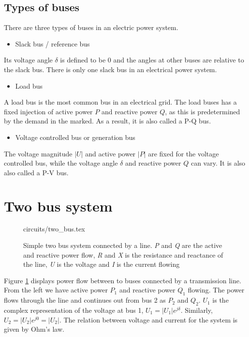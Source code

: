 \documentclass[class=book, crop=false]{standalone}
\begin{document}
\subsection{Types of buses}\label{theory:subsection:bus_types}

There are three types of buses in an electric power system\cite{opf_intro}.

\begin{itemize}
  \item Slack bus / reference bus
\end{itemize}
Its voltage angle $\delta$ is defined to be 0 and the angles at other buses are relative to the slack bus. There is only one slack bus in an electrical power system.

\begin{itemize}
  \item Load bus
\end{itemize}
A load bus is the most common bus in an electrical grid. The load buses has a fixed injection of active power $P$ and reactive power $Q$, as this is predetermined by the demand in the marked. As a result, it is also called a P-Q bus.

\begin{itemize}
  \item Voltage controlled bus or generation bus
\end{itemize}
The voltage magnitude $|U|$ and active power $|P|$ are fixed for the voltage controlled bus, while the voltage angle $\delta$ and reactive power $Q$ can vary. It is also also called a P-V bus. 


\section{Two bus system} 


\begin{figure}[ht!]
    \center
    {circuits/two_bus.tex}
    \caption[size = 9]
    {Simple two bus system connected by a line. \textit{P} and \textit{Q} are the active and reactive power flow, \textit{R} and \textit{X} is the resistance and reactance of the line, \textit{U} is the voltage and \textit{I} is the current flowing}    \label{fig:theory:two_bus}
\end{figure}

Figure \ref{fig:theory:two_bus} displays power flow between to buses connected by a transmission line. From the left we have active power $P_{1}$ and reactive power $Q_{1}$ flowing. The power flows through the line and continues out from bus 2 as $P_{2}$ and $Q_{2}$. $U_{1}$ is the complex representation of the voltage at bus 1, $U_{1} = |U_{1}|e^{j\delta}$. Similarly, $U_{2} = |U_{2}|e^{j0} = |U_{2}|$. The relation between voltage and current for the system is given by Ohm's law.
\end{document}
